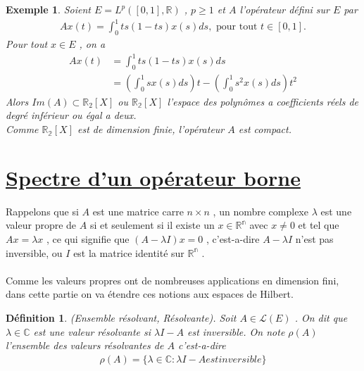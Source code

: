 \documentclass{report}
\newtheorem{Def}{Définition}[subsection]
\newtheorem{Ex}{Exemple}[subsection]
\begin{document}
{\begin{Ex} Soient $E = L^p([0,1], \mathbb{R})$ , $p \ge 1$ et $A$ l'opérateur défini sur $E$ par 
					\begin{align*}
							 A x(t) = \int_{0}^{1} ts(1-ts)x(s) ds , \,\,\text{pour tout}\,\, t \in [0,1] .
					\end{align*}
	Pour tout $x \in E$ , on a 
					\begin{align*}
							 Ax(t) &= \int_{0}^{1} ts(1-ts)x(s)ds \\
							 &= (\int_{0}^{1} sx(s)ds)t - (\int_{0}^{1} s^2 x(s) ds)t^2 
					\end{align*}
	Alors $Im(A) \subset \mathbb{R}_2[X]$ ou $\mathbb{R_2}[X]$ l'espace des polynômes a coefficients réels de degré inférieur ou égal a deux.\\
	Comme $\mathbb{R_2}[X]$ est de dimension finie, l'opérateur $A$ est compact.\\
\end{Ex}





\section{\underline{Spectre d'un opérateur borne}}

 Rappelons que si $A$ est une matrice carre $n \times n$ , un nombre complexe $\lambda$ est une valeur propre de $A$ si et seulement si il existe un $x \in \mathbb{R^n}$ avec $x \neq 0$ et tel que $A x = \lambda x$ , ce qui signifie que $(A - \lambda I)x = 0$ , c'est-a-dire $A - \lambda I$ n'est pas inversible, ou $I$ est la matrice identité sur $\mathbb{R^n}$ .\\ \\

 Comme les valeurs propres ont de nombreuses applications en dimension fini, dans cette partie on va étendre ces notions aux espaces de Hilbert.\\


\begin{Def} (Ensemble résolvant, Résolvante). Soit $A \in \mathscr{L}(E)$ . On dit que $\lambda \in \mathbb{C}$ est une valeur résolvante si $\lambda I - A$ est inversible. On note $\rho(A)$ l'ensemble des valeurs résolvantes de $A$ c'est-a-dire 
					\begin{align*}
						 \rho(A) = \{\lambda \in \mathbb{C} : \lambda I - A est inversible\} 
					\end{align*}
\end{Def}

}
\end{document}
